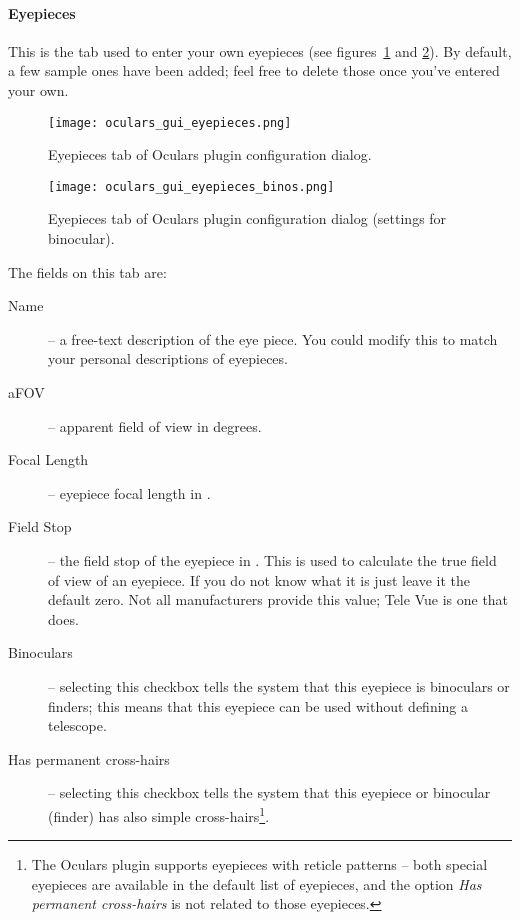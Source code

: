 \paragraph{Eyepieces}

This is the tab used to enter your own eyepieces (see figures~\ref{fig:plugins:Oculars:Gui:Eyepieces} and \ref{fig:plugins:Oculars:Gui:Eyepieces_binos}). 
By default, a few sample ones have been added; feel free to delete those once you've entered your own.

\begin{figure}[p]\centering
\texttt{[image: oculars\_gui\_eyepieces.png]}
\caption{Eyepieces tab of Oculars plugin configuration dialog.}
\label{fig:plugins:Oculars:Gui:Eyepieces}
\end{figure}

\begin{figure}[p]\centering
\texttt{[image: oculars\_gui\_eyepieces\_binos.png]}
\caption{Eyepieces tab of Oculars plugin configuration dialog (settings for binocular).}
\label{fig:plugins:Oculars:Gui:Eyepieces_binos}
\end{figure}


The fields on this tab are:
\begin{description}
\item[Name] -- a free-text description of the eye piece. You could modify this to match your personal descriptions of eyepieces.
\item[aFOV] -- apparent field of view in degrees.
\item[Focal Length] -- eyepiece focal length in \mm.
\item[Field Stop] -- the field stop of the eyepiece in \mm. This is used to calculate the true field of view of an eyepiece. If you do not know what it is just leave it the default zero. Not all manufacturers provide this value; Tele Vue is one that does.
\item[Binoculars] -- selecting this checkbox tells the system that this eyepiece is binoculars or finders; this means that this eyepiece can be used without defining a telescope.
\item[Has permanent cross-hairs] -- selecting this checkbox tells the system that this eyepiece or binocular (finder) has also simple cross-hairs\footnote{The Oculars plugin supports eyepieces with reticle patterns -- both special eyepieces are available in the default list of eyepieces, and the option \emph{Has permanent cross-hairs} is not related to those eyepieces.}.
\end{description}

